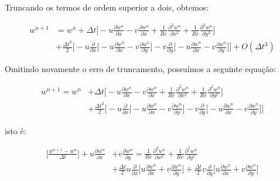 \medskip
\noindent
Truncando os termos de ordem superior a dois, obtemos:

\begin{equation}
\begin{aligned}
 w^{n+1} & = w^{n} 
          + \Delta t 
         \Bigg[
         - u \frac{\partial w^{n}}{\partial x}
         - v \frac{\partial w^{n}}{\partial x}
         + \frac{1}{Re} \frac{\partial^2 w^{n}}{\partial x^2} 
         + \frac{1}{Re} \frac{\partial^2 w^{n}}{\partial y^2} 
         \Bigg]
         \\[5pt]
         & + \frac{\Delta t^2}{2}
         \Bigg[
         - u
         \frac{\partial }{\partial x}
         \Bigg[
          - u \frac{\partial w^{n}}{\partial x}
          - v \frac{\partial w^{n}}{\partial y}
         \Bigg]
          - v
         \frac{\partial }{\partial y}
         \Bigg[
          - u \frac{\partial w^{n}}{\partial x}
          - v \frac{\partial w^{n}}{\partial y}
         \Bigg]
         \Bigg]
         + O(\Delta t^3)
\end{aligned}
\end{equation}

\medskip
\noindent
Omitindo novamente o erro de truncamento, possuímos
a seguinte equação:

\begin{equation}
\begin{aligned}
 w^{n+1} = w^{n} 
         & + \Delta t 
         \Bigg[
         - u \frac{\partial w^{n}}{\partial x}
         - v \frac{\partial w^{n}}{\partial x}
         + \frac{1}{Re} \frac{\partial^2 w^{n}}{\partial x^2} 
         + \frac{1}{Re} \frac{\partial^2 w^{n}}{\partial y^2} 
         \Bigg]
         \\[5pt]
         & + \frac{\Delta t^2}{2}
         \Bigg[
         - u
         \frac{\partial }{\partial x}
         \Bigg[
          - u \frac{\partial w^{n}}{\partial x}
          - v \frac{\partial w^{n}}{\partial y}
         \Bigg]
          - v
         \frac{\partial }{\partial y}
         \Bigg[
          - u \frac{\partial w^{n}}{\partial x}
          - v \frac{\partial w^{n}}{\partial y}
         \Bigg]
         \Bigg]
\end{aligned}
\end{equation}

\noindent
isto é:

\begin{equation}
\begin{aligned}
 \Bigg[
 \frac{w^{n+1} - w^{n}}{\Delta t}
 \Bigg]
 + u \frac{\partial w^{n}}{\partial x}
 & + v \frac{\partial w^{n}}{\partial y}
 = \frac{1}{Re} \frac{\partial^2 w^{n}}{\partial x^2} 
 + \frac{1}{Re} \frac{\partial^2 w^{n}}{\partial y^2} 
 \\[5pt]
 & + \frac{\Delta t}{2} u \frac{\partial }{\partial x}
 \Bigg[
   u \frac{\partial w^{n}}{\partial x}
 + v \frac{\partial w^{n}}{\partial y}
 \Bigg]
 + \frac{\Delta t}{2} v \frac{\partial }{\partial y}
 \Bigg[
   u \frac{\partial w^{n}}{\partial x}
 + v \frac{\partial w^{n}}{\partial y}
 \Bigg]
\end{aligned}
\end{equation}

